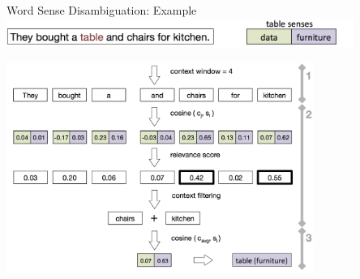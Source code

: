 \documentclass[accentcolor=tud9c,colorbacktitle,inverttitle,landscape,german,presentation]{tudbeamer}
\begin{document}
\begin{frame}{Word Sense Disambiguation: Example\\ 
		\includegraphics[width=0.85\textwidth]{wsd1}}
	\begin{center}
		\vspace{-0.3cm}
		\includegraphics[width=0.75\textwidth]{wsd2}
	\end{center}
\end{frame}
\end{document}
